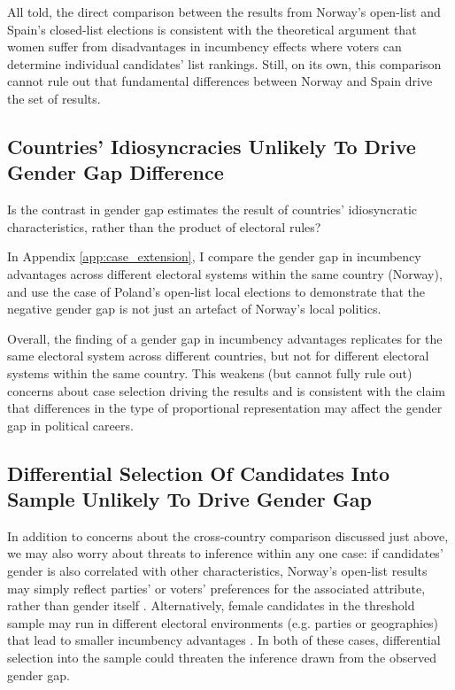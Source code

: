 \documentclass[12pt]{article}
\begin{document}
All told, the direct comparison between the results from Norway's open-list and Spain's closed-list elections is consistent with the theoretical argument that women suffer from disadvantages in incumbency effects where voters can determine individual candidates' list rankings. Still, on its own, this comparison cannot rule out that fundamental differences between Norway and Spain drive the set of results.

\subsection{Countries' Idiosyncracies Unlikely To Drive Gender Gap Difference}

Is the contrast in gender gap estimates the result of countries' idiosyncratic characteristics, rather than the product of electoral rules?

In Appendix \ref{app:case_extension}, I compare the gender gap in incumbency advantages across different electoral systems within the same country (Norway), and use the case of Poland's open-list local elections to demonstrate that the negative gender gap is not just an artefact of Norway's local politics.

Overall, the finding of a gender gap in incumbency advantages replicates for the same electoral system across different countries, but not for different electoral systems within the same country. This weakens (but cannot fully rule out) concerns about case selection driving the results and is consistent with the claim that differences in the type of proportional representation may affect the gender gap in political careers.

\subsection{Differential Selection Of Candidates Into Sample Unlikely To Drive Gender Gap}
\label{sec:diffsec}

In addition to concerns about the cross-country comparison discussed just above, we may also worry about threats to inference within any one case: if candidates' gender is also correlated with other characteristics, Norway's open-list results may simply reflect parties' or voters' preferences for the associated attribute, rather than gender itself \citep{bansak2021,teele2018}. Alternatively, female candidates in the threshold sample may run in different electoral environments (e.g. parties or geographies) that lead to smaller incumbency advantages \citep{folke2016a}. In both of these cases, differential selection into the sample could threaten the inference drawn from the observed gender gap.
\end{document}
